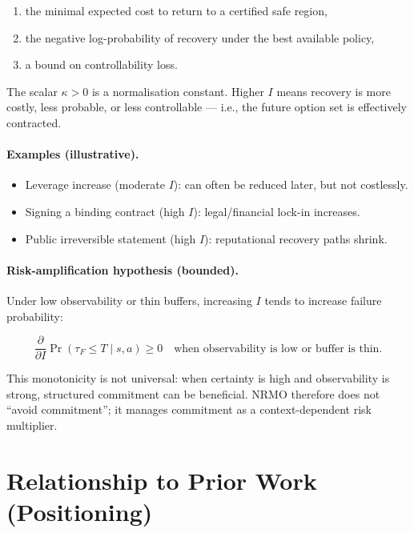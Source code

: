 \begin{enumerate}
\item the minimal expected cost to return to a certified safe
region,
\item the negative log-probability of recovery under the best
available policy,
\item a bound on controllability loss.
\end{enumerate}

\noindent
The scalar $\kappa > 0$ is a normalisation constant. Higher $I$
means recovery is more costly, less probable, or less
controllable --- i.e., the future option set is effectively
contracted.

\paragraph{Examples (illustrative).}
\begin{itemize}
\item Leverage increase (moderate $I$): can often be reduced later,
but not costlessly.
\item Signing a binding contract (high $I$): legal/financial lock-in
increases.
\item Public irreversible statement (high $I$): reputational
recovery paths shrink.
\end{itemize}

\paragraph{Risk-amplification hypothesis (bounded).}
Under low observability or thin buffers, increasing $I$ tends to
increase failure probability:

\begin{equation}
\frac{\partial}{\partial I} \Pr(\tau_F \le T \mid s, a) \ge 0
\quad \text{when observability is low or buffer is thin.}
\end{equation}

This monotonicity is not universal: when certainty is high and
observability is strong, structured commitment can be beneficial.
NRMO therefore does not ``avoid commitment''; it manages commitment
as a context-dependent risk multiplier.

\section{Relationship to Prior Work (Positioning)}
\label{sec:foundations-4-prior-work}

